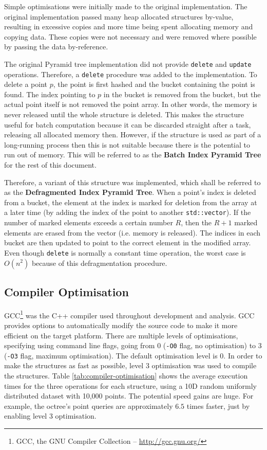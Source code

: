Simple optimisations were initially made to the original implementation. The original implementation passed many heap allocated structures by-value, resulting in excessive copies and more time being spent allocating memory and copying data. These copies were not necessary and were removed where possible by passing the data by-reference.

The original Pyramid tree implementation did not provide \texttt{delete} and \texttt{update} operations. Therefore, a \texttt{delete} procedure was added to the implementation. To delete a point $p$, the point is first hashed and the bucket containing the point is found. The index pointing to $p$ in the bucket is removed from the bucket, but the actual point itself is not removed the point array. In other words, the memory is never released until the whole structure is deleted. This makes the structure useful for batch computation because it can be discarded straight after a task, releasing all allocated memory then. However, if the structure is used as part of a long-running process then this is not suitable because there is the potential to run out of memory. This will be referred to as the \textbf{Batch Index Pyramid Tree} for the rest of this document.

Therefore, a variant of this structure was implemented, which shall be referred to as the \textbf{Defragmented Index Pyramid Tree}. When a point's index is deleted from a bucket, the element at the index is marked for deletion from the array at a later time (by adding the index of the point to another \texttt{std::vector}). If the number of marked elements exceeds a certain number $R$, then the $R + 1$ marked elements are erased from the vector (i.e. memory is released). The indices in each bucket are then updated to point to the correct element in the modified array. Even though \texttt{delete} is normally a constant time operation, the worst case is $O(n^2)$ because of this defragmentation procedure.

\subsection{Compiler Optimisation}

GCC\footnote{GCC, the GNU Compiler Collection -- \url{http://gcc.gnu.org/}} was the C++ compiler used throughout development and analysis. GCC provides options to automatically modify the source code to make it more efficient on the target platform. There are multiple levels of optimisations, specifying using command line flags, going from 0 (\texttt{-O0} flag, no optimisation) to 3 (\texttt{-O3} flag, maximum optimisation). The default optimisation level is 0. In order to make the structures as fast as possible, level 3 optimisation was used to compile the structures. Table \ref{tab:compiler-optimisation} shows the average execution times for the three operations for each structure, using a 10D random uniformly distributed dataset with 10,000 points. The potential speed gains are huge. For example, the octree's point queries are approximately $6.5$ times faster, just by enabling level 3 optimisation.

